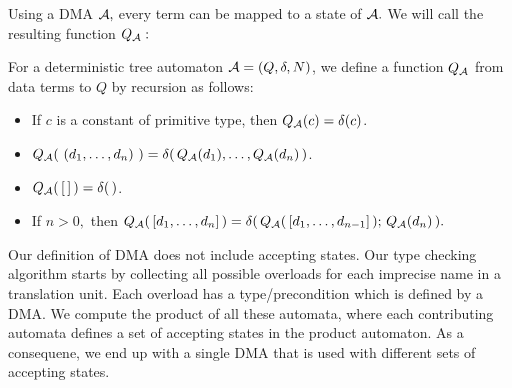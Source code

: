 Using a DMA $ {\cal A}, $ every term can be mapped to a state of
$ {\cal A}. $ We will call the resulting function $ Q_{\cal A}: $
\begin{definition}
   For a deterministic tree automaton $ {\cal A} = ( Q, \delta, N ) $,
   we define a function $ Q_{\cal A} $ from data terms to $ Q $
   by recursion as follows:
   \begin{itemize}
   \item
      If $ c $ is a constant of primitive type,
      then $ Q_{\cal A}(c) = \delta(c) $.
   \item
      $ Q_{\cal A}( \ ( d_1, \ldots, d_n ) \ ) =
         \delta( \, Q_{\cal A}(d_1),\ldots,Q_{\cal A}(d_n) \, ) $.
   \item
      $ Q_{\cal A}( \, [ \, ] \, ) = \delta( \, ) $.
   \item
     If $ n > 0, $ then
     $ Q_{\cal A}( \, [ d_1, \ldots, d_n ] \, ) =
          \delta( \, Q_{\cal A}( \, [ d_1, \ldots, d_{n-1} ] \, ); \,
                     Q_{\cal A}(d_n) \, ). $
   \end{itemize}
\end{definition}
Our definition of DMA does not include accepting states.
Our type checking algorithm starts by collecting all possible overloads
for each imprecise name in a translation unit.
Each overload has a type/precondition which
is defined by a DMA. We compute the product of all these automata,
where each contributing automata defines a set of accepting states
in the product automaton. As a consequene, we end up with a single
DMA that is used with different sets of accepting states.

